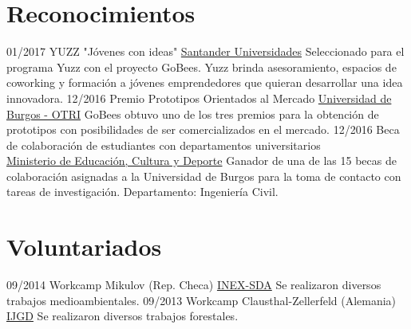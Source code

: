 \documentclass[]{friggeri-cv}
\begin{document}
\section{Reconocimientos}
\begin{entrylist}
  \entry
    {01/2017}
    {YUZZ "Jóvenes con ideas"}
    {\href{http://yuzz.org.es/}{Santander Universidades}}
    {Seleccionado para el programa Yuzz con el proyecto GoBees. Yuzz brinda asesoramiento, espacios de coworking y formación a jóvenes emprendedores que quieran desarrollar una idea innovadora.}
  \entry
    {12/2016}
    {Premio Prototipos Orientados al Mercado}
    {\href{http://wwww.ubu.es/te-interesa/convocatoria-prototipos-orientados-al-mercado-curso-2016-2017}{Universidad de Burgos - OTRI}}
    {GoBees obtuvo uno de los tres premios para la obtención de prototipos con posibilidades de ser comercializados en el mercado.}
  \entry
    {12/2016}
    {Beca de colaboración de estudiantes con departamentos universitarios\\}
    {\href{http://www.mecd.gob.es/}{Ministerio de Educación, Cultura y Deporte}}
    {Ganador de una de las 15 becas de colaboración asignadas a la Universidad de Burgos para la toma de contacto con tareas de investigación. Departamento: Ingeniería Civil.}  
\end{entrylist}

\section{Voluntariados}
\begin{entrylist}
  \entry
    {09/2014}
    {Workcamp Mikulov (Rep. Checa)}
    {\href{https://www.inexsda.cz/}{INEX-SDA}}
    {Se realizaron diversos trabajos medioambientales.}
  \entry
    {09/2013}
    {Workcamp Clausthal-Zellerfeld (Alemania)}
    {\href{http://www.ijgd.de/}{IJGD}}
    {Se realizaron diversos trabajos forestales.}
\end{entrylist}
\end{document}
